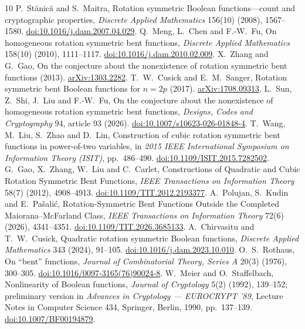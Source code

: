 \documentclass[11pt,a4paper]{article}
\theoremstyle{remark}
\theoremstyle{plain}
\begin{document}
\begin{thebibliography}{10}
 P.~St\u{a}nic\u{a} and S.~Maitra, Rotation symmetric Boolean functions---count and cryptographic properties, \emph{Discrete Applied Mathematics} 156(10) (2008), 1567--1580. \href{https://doi.org/10.1016/j.dam.2007.04.029}{doi:10.1016/j.dam.2007.04.029}.
 Q.~Meng, L.~Chen and F.-W.~Fu, On homogeneous rotation symmetric bent functions, \emph{Discrete Applied Mathematics} 158(10) (2010), 1111--1117. \href{https://doi.org/10.1016/j.dam.2010.02.009}{doi:10.1016/j.dam.2010.02.009}.
 X.~Zhang and G.~Gao, On the conjecture about the nonexistence of rotation symmetric bent functions (2013). \href{https://arxiv.org/abs/1303.2282}{arXiv:1303.2282}.
 T.~W.~Cusick and E.~M.~Sanger, Rotation symmetric bent Boolean functions for $n=2p$ (2017). \href{https://arxiv.org/abs/1708.09313}{arXiv:1708.09313}.
 L.~Sun, Z.~Shi, J.~Liu and F.-W.~Fu, On the conjecture about the nonexistence of homogeneous rotation symmetric bent functions, \emph{Designs, Codes and Cryptography} 94, article 93 (2026). \href{https://doi.org/10.1007/s10623-026-01848-4}{doi:10.1007/s10623-026-01848-4}.
 T.~Wang, M.~Liu, S.~Zhao and D.~Lin, Construction of cubic rotation symmetric bent functions in power-of-two variables, in \emph{2015 IEEE International Symposium on Information Theory (ISIT)}, pp.~486--490. \href{https://doi.org/10.1109/ISIT.2015.7282502}{doi:10.1109/ISIT.2015.7282502}.
 G.~Gao, X.~Zhang, W.~Liu and C.~Carlet, Constructions of Quadratic and Cubic Rotation Symmetric Bent Functions, \emph{IEEE Transactions on Information Theory} 58(7) (2012), 4908--4913. \href{https://doi.org/10.1109/TIT.2012.2193377}{doi:10.1109/TIT.2012.2193377}.
 A.~Polujan, S.~Kudin and E.~Pa\v{s}ali\'c, Rotation-Symmetric Bent Functions Outside the Completed Maiorana--McFarland Class, \emph{IEEE Transactions on Information Theory} 72(6) (2026), 4341--4351. \href{https://doi.org/10.1109/TIT.2026.3685133}{doi:10.1109/TIT.2026.3685133}.
 A.~Chirvasitu and T.~W.~Cusick, Quadratic rotation symmetric Boolean functions, \emph{Discrete Applied Mathematics} 343 (2024), 91--105. \href{https://doi.org/10.1016/j.dam.2023.10.010}{doi:10.1016/j.dam.2023.10.010}.
 O.~S.~Rothaus, On ``bent'' functions, \emph{Journal of Combinatorial Theory, Series A} 20(3) (1976), 300--305. \href{https://doi.org/10.1016/0097-3165(76)90024-8}{doi:10.1016/0097-3165(76)90024-8}.
 W.~Meier and O.~Staffelbach, Nonlinearity of Boolean functions, \emph{Journal of Cryptology} 5(2) (1992), 139--152; preliminary version in \emph{Advances in Cryptology --- EUROCRYPT '89}, Lecture Notes in Computer Science 434, Springer, Berlin, 1990, pp.~137--139. \href{https://doi.org/10.1007/BF00194879}{doi:10.1007/BF00194879}.
\end{thebibliography}
\end{document}
